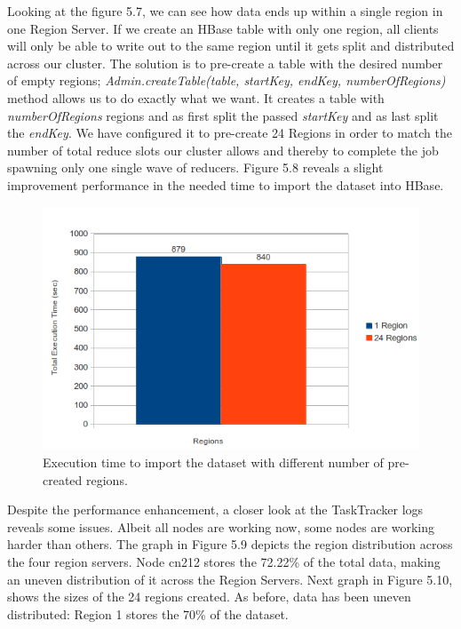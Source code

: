 Looking at the figure 5.7, we can see how data ends up within a single region in one Region Server. If we create an HBase table with only one region, all clients will only be able to write out to the same region until it gets split and distributed across our cluster. The solution is to pre-create a table with the desired number of empty regions; \textit{Admin.createTable(table, startKey, endKey, numberOfRegions)} method allows us to do exactly what we want. It creates a table with \textit{numberOfRegions} regions and as first split the passed \textit{startKey} and as last split the \textit{endKey}. We have configured it to pre-create 24 Regions in order to match the number of total reduce slots our cluster allows and thereby to complete the job spawning only one single wave of reducers. Figure 5.8 reveals a slight improvement performance in the needed time to import the dataset into HBase.


\begin{figure}[htb]
\centering
\includegraphics[width=1\textwidth]{./images/1-24regions1.png}
\caption{Execution time to import the dataset with different number of pre-created regions.} \label{fig:regions}
\end{figure}

Despite the performance enhancement, a closer look at the TaskTracker logs reveals some issues. Albeit all nodes are working now, some nodes are working harder than others. The graph in Figure 5.9 depicts the region distribution across the four region servers. Node cn212 stores the 72.22\% of the total data, making an uneven distribution of it across the Region Servers. Next graph in Figure 5.10, shows the sizes of the 24 regions created. As before, data has been uneven distributed: Region 1 stores the 70\% of the dataset.




